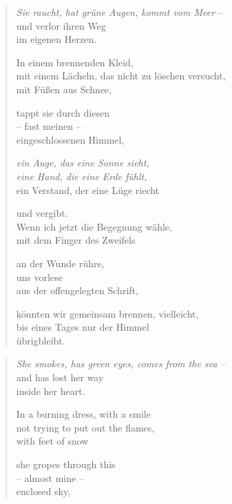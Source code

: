 
{\setlength{\stanzaskip}{0.6em}

\cleartoverso


\begin{verse}

\emph{Sie raucht, hat grüne Augen, kommt vom Meer} --\label{marina-autobio}\\
und verlor ihren Weg\\
im eigenen Herzen.

In einem brennenden Kleid,\\
mit einem Lächeln, das nicht zu löschen versucht,\\
mit Füßen aus Schnee,

tappt sie durch diesen\\
-- fast meinen --\\
eingeschlossenen Himmel,

\emph{ein Auge, das eine Sonne sieht,\\
eine Hand, die eine Erde fühlt,}\label{schop-die-welt}\\
ein Verstand, der eine Lüge riecht

und vergibt.\\
Wenn ich jetzt die Begegnung wähle,\\
mit dem Finger des Zweifels

an der Wunde rühre,\\
uns vorlese\\
aus der offengelegten Schrift,

könnten wir gemeinsam brennen, vielleicht,\\
bis eines Tages nur der Himmel\\
übrigbleibt.

\end{verse}

\clearpage


\begin{verse}

\emph{She smokes, has green eyes, comes from the sea --}\\
and has lost her way\\
inside her heart.

In a burning dress, with a smile\\
not trying to put out the flames,\\
with feet of snow

she gropes through this\\
-- almost mine --\\
enclosed sky,


\end{verse}}
